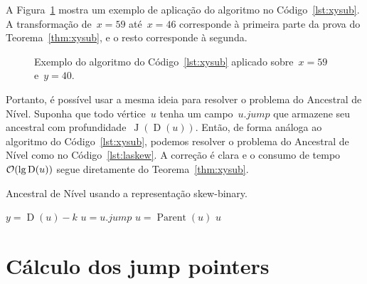 \documentclass[main.tex]{subfiles}
\newcommand{\Par}{\operatorname{Parent}}
\newcommand{\Dep}{\operatorname{D}}
\newcommand{\CSB}{\textit{CSB}}
\newcommand{\J}{\operatorname{J}}
\begin{document}
A Figura~\ref{fig:exxysub} mostra um exemplo de aplicação do algoritmo no Código~\ref{lst:xysub}. A transformação de~$x = 59$ até~$x = 46$ corresponde à primeira parte da prova do Teorema~\ref{thm:xysub}, e o resto corresponde à segunda.

\begin{figure}[H]
\caption{Exemplo do algoritmo do Código~\ref{lst:xysub} aplicado sobre~$x = 59$ e~$y = 40$.} \label{fig:exxysub}
\end{figure}

\newcommand{\jmp}{\mathit{jump}}
Portanto, é possível usar a mesma ideia para resolver o problema do Ancestral de Nível. Suponha que todo vértice~$u$ tenha um campo~$u.\jmp$ que armazene seu ancestral com profundidade~$\J(\Dep(u))$. Então, de forma análoga ao algoritmo do Código~\ref{lst:xysub}, podemos resolver o problema do Ancestral de Nível como no Código~\ref{lst:laskew}. A correção é clara e o consumo de tempo~$\Oh(\lg\Dep(u))$ segue diretamente do Teorema~\ref{thm:xysub}.

\begin{algorithm}
\caption{Ancestral de Nível usando a representação skew-binary.} \label{lst:laskew}
\begin{algorithmic}[1]
		\State $y = \Dep(u) - k$
		\While{$\Dep(u) \neq y$}
			\If{$\Dep(u.\jmp) \geq y$}
				\State $u = u.\jmp$
			\Else
				\State $u = \Par(u)$
			\EndIf
		\EndWhile
		\State \Return $u$
	\EndFunction
\end{algorithmic}
\end{algorithm}

\section{Cálculo dos jump pointers}
\end{document}
